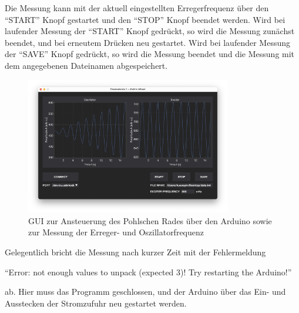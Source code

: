 \documentclass[ngerman,a4paper,11pt]{article}
\begin{document}
Die Messung kann mit der aktuell eingestellten Erregerfrequenz über den \enquote{START} Knopf gestartet und den \enquote{STOP} Knopf beendet werden. Wird bei laufender Messung der \enquote{START} Knopf gedrückt, so wird die Messung zunächst beendet, und bei erneutem Drücken neu gestartet. Wird bei laufender Messung der \enquote{SAVE} Knopf gedrückt, so wird die Messung beendet und die Messung mit dem angegebenen Dateinamen abgespeichert.
\begin{figure}[H]
  \centering
  \includegraphics[width=0.8\textwidth]{screenshot-gui.png}
  \caption{GUI zur Ansteuerung des Pohlschen Rades über den Arduino sowie zur Messung der Erreger- und Oszillatorfrequenz}
  \label{fig:gui}
\end{figure}
Gelegentlich bricht die Messung nach kurzer Zeit mit der Fehlermeldung

\hspace{1em} \enquote{Error: not enough values to unpack (expected 3)! Try restarting the Arduino!}

ab. Hier muss das Programm geschlossen, und der Arduino über das Ein- und Ausstecken der Stromzufuhr neu gestartet werden.
\end{document}
